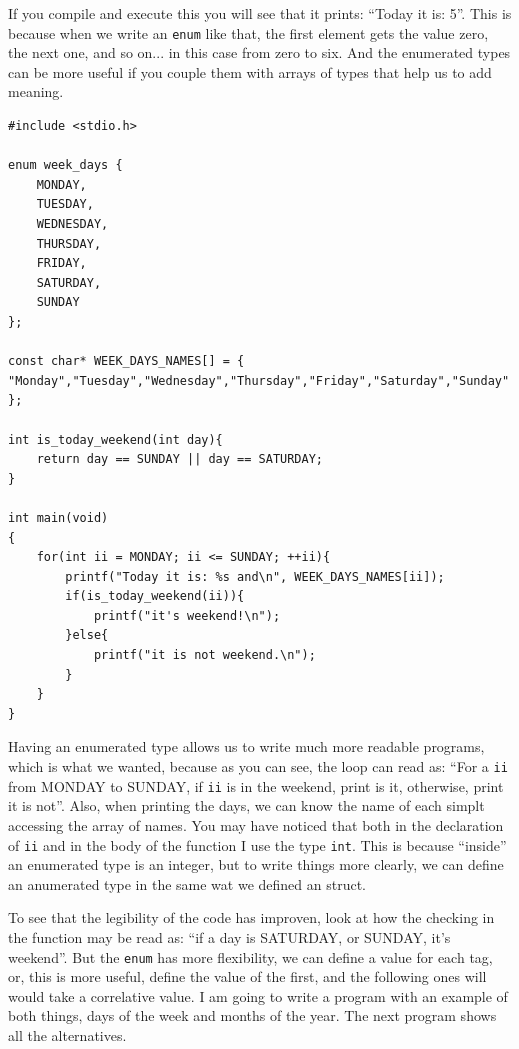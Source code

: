 \documentclass[a4paper]{article}
\begin{document}
If you compile and execute this you will see that it prints: ``Today it is: 5''.
This is because when we write an \verb!enum! like that, the first element gets
the value zero, the next one, and so on... in this case from zero to six. And
the enumerated types can be more useful if you couple them with arrays of types
that help us to add meaning.

\noindent
\begin{minipage}[H]{\linewidth}
\mbox{}
\begin{lstlisting}[style=C,
caption={Enum used alongside name array},
label={lst:EnumWithNames}]
#include <stdio.h>

enum week_days {
    MONDAY,
    TUESDAY,
    WEDNESDAY,
    THURSDAY,
    FRIDAY,
    SATURDAY,
    SUNDAY
};

const char* WEEK_DAYS_NAMES[] = { "Monday","Tuesday","Wednesday","Thursday","Friday","Saturday","Sunday" };

int is_today_weekend(int day){
    return day == SUNDAY || day == SATURDAY;
}

int main(void)
{
    for(int ii = MONDAY; ii <= SUNDAY; ++ii){
        printf("Today it is: %s and\n", WEEK_DAYS_NAMES[ii]);
        if(is_today_weekend(ii)){
            printf("it's weekend!\n");
        }else{
            printf("it is not weekend.\n");
        }
    }
}
\end{lstlisting}
\end{minipage}

Having an enumerated type allows us to write much more readable
programs, which is what we wanted, because as you can see, the loop can read
as: ``For a \verb!ii! from MONDAY to SUNDAY, if \verb!ii! is in the weekend,
print is it, otherwise, print it is not''. Also, when printing the days, we can
know the name of each simplt accessing the array of names. You may have noticed
that both in the declaration of \verb!ii! and in the body of the function I use
the type \verb!int!. This is because ``inside'' an enumerated type is an
integer, but to write things more clearly, we can define an anumerated type
in the same wat we defined an struct.

To see that the legibility of the code has improven, look at how the checking
in the function may be read as: ``if a day is SATURDAY, or SUNDAY, it's
weekend''. But the \verb!enum! has more flexibility, we can define a value for
each tag, or, this is more useful, define the value of the first, and the
following ones will would take a correlative value. I am going to write a
program with an example of both things, days of the week and months of the
year. The next program shows all the alternatives.
\end{document}
